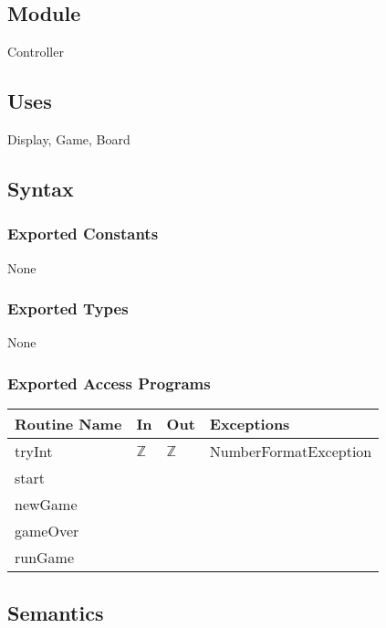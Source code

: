 \documentclass[12pt]{article}
\begin{document}
\subsection*{Module}

Controller

\subsection* {Uses}

Display, Game, Board

\subsection* {Syntax}

\subsubsection* {Exported Constants}

None

\subsubsection* {Exported Types}

None

\subsubsection* {Exported Access Programs}

\begin{tabular}{|l|l|l|p{5cm}|}
\hline
\textbf{Routine Name} & \textbf{In}  & \textbf{Out} & \textbf{Exceptions}   \\ \hline
tryInt                & $\mathbb{Z}$ & $\mathbb{Z}$ & NumberFormatException \\ \hline
start                 &              &              &                       \\ \hline
newGame               &              &              &                       \\ \hline
gameOver              &              &              &                       \\ \hline
runGame               &              &              &                       \\ \hline
\end{tabular}

\subsection* {Semantics}
\end{document}
